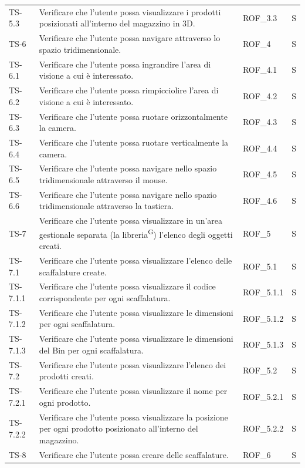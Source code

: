 \begin{xltabular}{0.9\textwidth}{X | p{0.5\textwidth} | X | p{0.9cm}}
    TS-5.3 & Verificare che l'utente possa visualizzare i prodotti posizionati all'interno del magazzino in 3D. & ROF\_3.3& S\\    
    TS-6 & Verificare che l'utente possa navigare attraverso lo spazio tridimensionale. & ROF\_4& S\\
    TS-6.1 & Verificare che l'utente possa ingrandire l'area di visione a cui è interessato. & ROF\_4.1& S \\
    TS-6.2 & Verificare che l'utente possa rimpicciolire l'area di visione a cui è interessato. &  ROF\_4.2& S \\
    TS-6.3 & Verificare che l'utente possa ruotare orizzontalmente la camera. & ROF\_4.3 & S \\
    TS-6.4 & Verificare che l'utente possa ruotare verticalmente la camera. & ROF\_4.4& S \\
    TS-6.5 & Verificare che l'utente possa navigare nello spazio tridimensionale attraverso il mouse. & ROF\_4.5& S \\
    TS-6.6 & Verificare che l'utente possa navigare nello spazio tridimensionale attraverso la tastiera. & ROF\_4.6& S\\
    TS-7 & Verificare che l'utente possa visualizzare in un'area gestionale separata (la libreria\textsuperscript{G}) l'elenco degli oggetti creati. & ROF\_5& S \\
    TS-7.1 & Verificare che l'utente possa visualizzare l'elenco delle scaffalature create. & ROF\_5.1& S \\
    TS-7.1.1 & Verificare che l'utente possa visualizzare il codice corrispondente per ogni scaffalatura. & ROF\_5.1.1& S \\
    TS-7.1.2 & Verificare che l'utente possa visualizzare le dimensioni per ogni scaffalatura.& ROF\_5.1.2& S \\
    TS-7.1.3 & Verificare che l'utente possa visualizzare le dimensioni del Bin per ogni scaffalatura.& ROF\_5.1.3& S\\
    TS-7.2 & Verificare che l'utente possa visualizzare l'elenco dei prodotti creati. & ROF\_5.2& S \\
    TS-7.2.1 & Verificare che l'utente possa visualizzare il nome per ogni prodotto. & ROF\_5.2.1  & S \\
    TS-7.2.2 & Verificare che l'utente possa visualizzare la posizione per ogni prodotto posizionato all'interno del magazzino. & ROF\_5.2.2& S\\
    TS-8 & Verificare che l'utente possa creare delle scaffalature. & ROF\_6& S\\

\end{xltabular}
